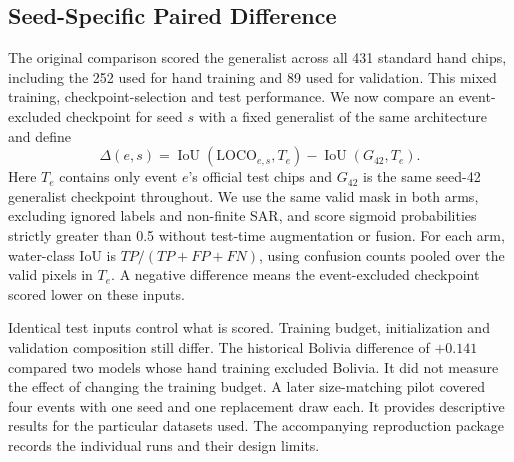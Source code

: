 \subsection{Seed-Specific Paired Difference}
\label{sec:paired}

The original comparison scored the generalist across all 431 standard
hand chips, including the 252 used for hand training and 89 used for
validation. This mixed training, checkpoint-selection and test performance.
We now compare an event-excluded checkpoint for seed $s$ with a fixed
generalist of the same architecture and define
\begin{equation}
\Delta(e,s)=\operatorname{IoU}(\mathrm{LOCO}_{e,s},T_e)
             -\operatorname{IoU}(G_{42},T_e).
\label{eq:paired}
\end{equation}
Here $T_e$ contains only event $e$'s official test chips and $G_{42}$ is
the same seed-42 generalist checkpoint throughout. We use the same valid
mask in both arms, excluding ignored labels and non-finite SAR, and score
sigmoid probabilities strictly greater than 0.5 without test-time
augmentation or fusion. For each arm, water-class IoU is
$TP/(TP+FP+FN)$, using confusion counts pooled over the valid pixels in
$T_e$. A negative difference means the event-excluded checkpoint scored
lower on these inputs.

Identical test inputs control what is scored. Training budget,
initialization and validation composition still differ. The historical
Bolivia difference of $+0.141$ compared two models whose hand training
excluded Bolivia. It did not measure the effect of changing the
training budget. A later
size-matching pilot covered four events with one seed and one replacement
draw each. It provides descriptive results for the particular datasets
used. The accompanying reproduction package records the individual
runs and their design limits.
